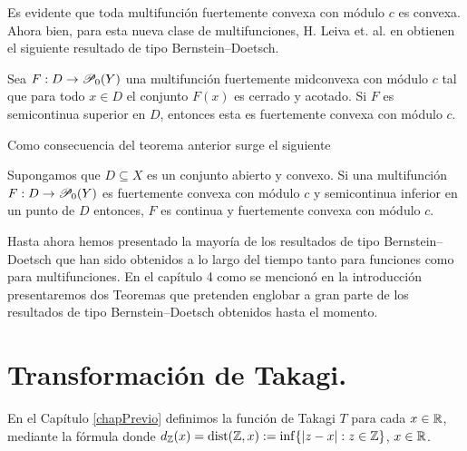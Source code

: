 Es evidente que toda multifunción fuertemente convexa con módulo $c$
es convexa. Ahora bien, para esta nueva clase de multifunciones,
H. Leiva et. al. en \cite{LeiMerNikSan13} obtienen el siguiente
resultado de tipo Bernstein--Doetsch.

\begin{theorem}
Sea $F:D\to\P_0(Y)$ una multifunci\'on fuertemente midconvexa con m\'odulo
$c$ tal que para todo $x\in D$ el conjunto $F(x)$ es cerrado y acotado. Si
$F$ es semicontinua superior en $D$, entonces esta es fuertemente
convexa con m\'odulo $c$.
\end{theorem}   

Como consecuencia del teorema anterior surge el siguiente

\begin{corollary}
Supongamos que $D\subseteq X$ es un conjunto abierto y convexo. Si 
una multifunci\'on $F:D\to\P_0(Y)$ es fuertemente convexa con m\'odulo
$c$ y semicontinua inferior en un punto de $D$ entonces, $F$ es continua
y fuertemente convexa con m\'odulo $c$.
\end{corollary}

Hasta ahora hemos presentado la mayoría de los resultados de tipo Bernstein--Doetsch
que han sido obtenidos a lo largo del tiempo tanto para funciones como para
multifunciones. En el cap\'itulo 4 como se mencion\'o en la introducci\'on 
presentaremos dos Teoremas que pretenden englobar a gran parte de los resultados
de tipo Bernstein--Doetsch obtenidos hasta el momento.


\section{Transformación de Takagi.}

En el Capítulo \ref{chapPrevio} definimos la función de Takagi
$T$ para cada $x\in\R$, mediante la fórmula
donde $d_\Z(x) = \dist(\Z,x):=\inf\{|z-x| : z\in\Z\}$, $x\in\R$.

